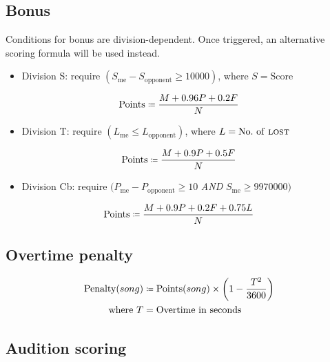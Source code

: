 \documentclass{article}
\newcommand{\scoreformula}[1]{{\color{red} #1}}
\newcommand{\penalyformula}[1]{{\color{cyan} #1}}
\begin{document}
\subsection{Bonus}

Conditions for bonus are division-dependent.
Once triggered, an alternative scoring formula
will be used instead.

\begin{itemize}
	\item Division S: require $(S_\text{me} - S_\text{opponent} \geq \num[group-separator={,}]{10000})$, where $S = \text{Score}$
\end{itemize}
\scoreformula{
	\begin{equation*}
		\Points \coloneq \frac{M + 0.96P + 0.2F}N
	\end{equation*}
}

\begin{itemize}
	\item Division T: require $(L_\text{me} \leq L_\text{opponent})$, where $L = \text{No.~of \Lost}$
\end{itemize}
\scoreformula{
	\begin{equation*}
		\Points \coloneq \frac{M + 0.9P + 0.5F}N
	\end{equation*}
}

\begin{itemize}
	\item Division Cb: require $(P_\text{me} - P_\text{opponent} \geq 10$ \emph{AND} $S_\text{me} \geq \num[group-separator={,}]{9970000})$
\end{itemize}
\scoreformula{
	\begin{equation*}
		\Points \coloneq \frac{M + 0.9P + 0.2F + 0.75L}N
	\end{equation*}
}

\subsection{Overtime penalty}
\penalyformula{
	\begin{align*}
		\text{Penalty}(song) & \coloneq \Points(song) \times \left(1-\frac{{T}^2} {3600}\right) \\
		\text{where}~T       & = \text{Overtime in seconds}
	\end{align*}
}

\subsection{Audition scoring}
\end{document}
